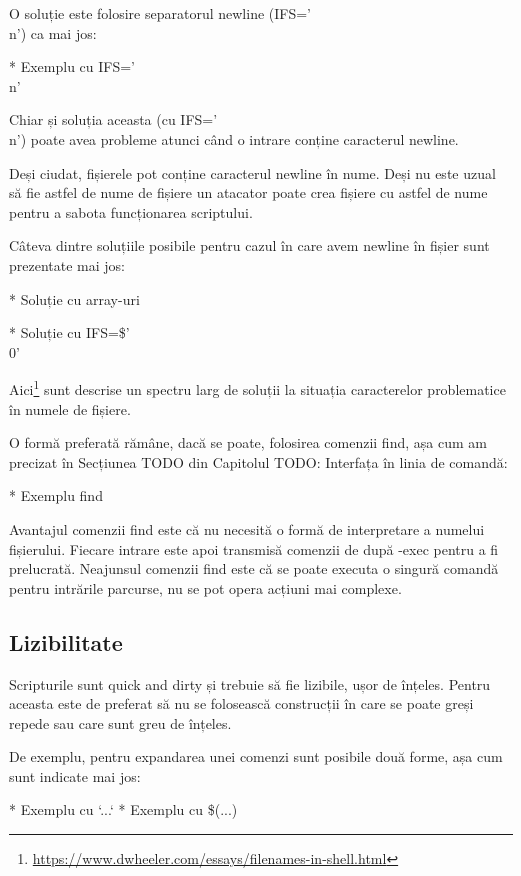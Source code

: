 O soluție este folosire separatorul newline (IFS=’\\n’) ca mai jos:

* Exemplu cu IFS=’\\n’

Chiar și soluția aceasta (cu IFS=’\\n’) poate avea probleme atunci când o intrare
conține caracterul newline.
\begin{note}[NOTĂ]
Deși ciudat, fișierele pot conține caracterul newline în nume. Deși nu este
uzual să fie astfel de nume de fișiere un atacator poate crea fișiere cu
astfel de nume pentru a sabota funcționarea scriptului.
\end{note}

Câteva dintre soluțiile posibile pentru cazul în care avem newline în fișier
sunt prezentate mai jos:

* Soluție cu array-uri

* Soluție cu IFS=\$’\\0’

Aici\footnote{\url{https://www.dwheeler.com/essays/filenames-in-shell.html}}
sunt descrise un spectru larg de soluții la situația caracterelor problematice
în numele de fișiere.

O formă preferată rămâne, dacă se poate, folosirea comenzii find, așa cum am
precizat în Secțiunea TODO din Capitolul TODO: Interfața în linia de comandă:

* Exemplu find

Avantajul comenzii find este că nu necesită o formă de interpretare a numelui
fișierului. Fiecare intrare este apoi transmisă comenzii de după -exec pentru a
fi prelucrată. Neajunsul comenzii find este că se poate executa o singură
comandă pentru intrările parcurse, nu se pot opera acțiuni mai complexe.

\subsection{Lizibilitate}
\label{sec:script-advancedfunc-readability}

Scripturile sunt quick and dirty și trebuie să fie lizibile, ușor de înțeles.
Pentru aceasta este de preferat să nu se folosească construcții în care se poate
greși repede sau care sunt greu de înțeles.

De exemplu, pentru expandarea unei comenzi sunt posibile două forme, așa cum
sunt indicate mai jos:

* Exemplu cu `...`
* Exemplu cu \$(...)

